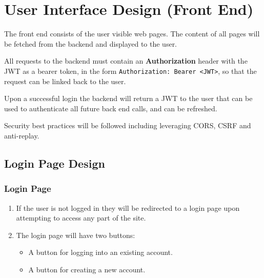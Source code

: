 \newpage %
\section{User Interface Design (Front End)}
The front end consists of the user visible web pages.
The content of all pages will be fetched from the backend and displayed to the user.

All requests to the backend must contain an \textbf{Authorization} header with the JWT as a bearer token, in the form \texttt{Authorization: Bearer <JWT>}, so that the request can be linked back to the user.

Upon a successful login the backend will return a JWT to the user that can be used to authenticate all future back end calls, and can be refreshed.

Security best practices will be followed including leveraging CORS, CSRF and anti-replay.

\subsection{Login Page Design}
    \subsubsection{Login Page}
        \begin{enumerate}[leftmargin=3\parindent]
            \item If the user is not logged in they will be redirected to a login page upon attempting to access any part of the site.
            \item The login page will have two buttons:
                \begin{itemize}
                    \item A button for logging into an existing account.
                    \item A button for creating a new account.
                \end{itemize}
        \end{enumerate}
